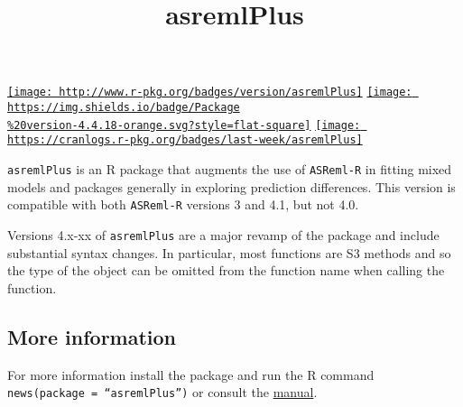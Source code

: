 \documentclass[
]{article}
\title{asremlPlus}
\author{}
\date{\vspace{-2.5em}}
\begin{document}
\maketitle

\href{http://www.repostatus.org/\#active}{}
\href{https://cran.r-project.org/}{}
\href{https://cran.r-project.org/package=asremlPlus}{\texttt{[image: http://www.r-pkg.org/badges/version/asremlPlus]}}
\href{/commits/master}{\texttt{[image: https://img.shields.io/badge/Package\\\%20version-4.4.18-orange.svg?style=flat-square]}}
\href{/commits/master}{}
\href{http://choosealicense.com/licenses/mit/}{}
\href{commits/master}{\texttt{[image: https://cranlogs.r-pkg.org/badges/last-week/asremlPlus]}}

\texttt{asremlPlus} is an R package that augments the use of
\texttt{ASReml-R} in fitting mixed models and packages generally in
exploring prediction differences. This version is compatible with both
\texttt{ASReml-R} versions 3 and 4.1, but not 4.0.

Versions 4.x-xx of \texttt{asremlPlus} are a major revamp of the package
and include substantial syntax changes. In particular, most functions
are S3 methods and so the type of the object can be omitted from the
function name when calling the function.

\hypertarget{more-information}{%
\subsection{More information}\label{more-information}}

For more information install the package and run the R command
\texttt{news(package\ =\ “asremlPlus”)} or consult the
\href{./vignettes/asremlPlus-manual.pdf}{manual}.
\end{document}
